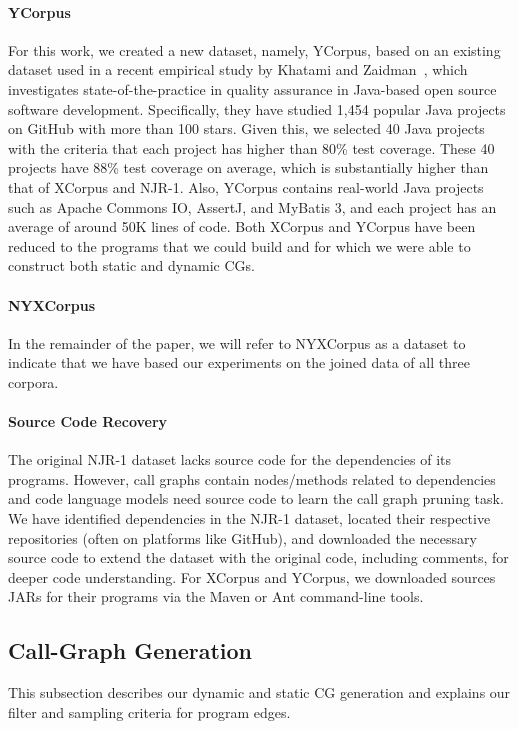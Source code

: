 \paragraph{YCorpus}
For this work, we created a new dataset, namely, YCorpus, based on an existing dataset used in a recent empirical study by Khatami and Zaidman~\cite{khatami2023state}, which investigates state-of-the-practice in quality assurance in Java-based open source software development. Specifically, they have studied 1,454 popular Java projects on GitHub with more than 100 stars. Given this, we selected 40 Java projects with the criteria that each project has higher than 80\% test coverage. These 40 projects have 88\% test coverage on average, which is substantially higher than that of XCorpus and NJR-1.
Also, YCorpus contains real-world Java projects such as Apache Commons IO, AssertJ, and MyBatis 3, and each project has an average of around 50K lines of code.
Both XCorpus and YCorpus have been reduced to the programs that we could build and for which we were able to construct both static and dynamic CGs.

\paragraph{NYXCorpus}
In the remainder of the paper, we will refer to NYXCorpus as a dataset to indicate that we have based our experiments on the joined data of all three corpora.

\paragraph{Source Code Recovery}
The original NJR-1 dataset lacks source code for the dependencies of its programs.
However, call graphs contain nodes/methods related to dependencies and code language models need source code to learn the call graph pruning task.
We have identified dependencies in the NJR-1 dataset, located their respective repositories (often on platforms like GitHub), and downloaded the necessary source code to extend the dataset with the original code, including comments, for deeper code understanding.
For XCorpus and YCorpus, we downloaded sources JARs for their programs via the Maven or Ant command-line tools.

\subsection{Call-Graph Generation}\label{ch1:subsec:CGG}
This subsection describes our dynamic and static CG generation and explains our filter and sampling criteria for program edges.

